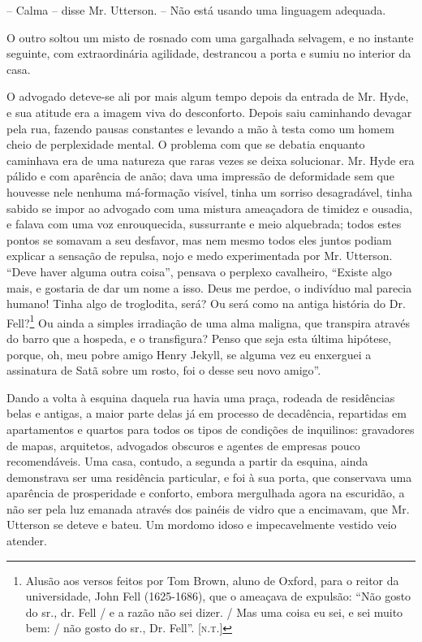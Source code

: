 -- Calma -- disse Mr. Utterson. -- Não está usando uma linguagem
adequada.

O outro soltou um misto de rosnado com uma gargalhada selvagem, e no
instante seguinte, com extraordinária agilidade, destrancou a porta e
sumiu no interior da casa.

O advogado deteve-se ali por mais algum tempo depois da entrada de Mr.
Hyde, e sua atitude era a imagem viva do desconforto.  Depois saiu
caminhando devagar pela rua, fazendo pausas constantes e levando a mão à
testa como um homem cheio de perplexidade mental.  O problema com que
se debatia enquanto caminhava era de uma natureza que raras vezes se
deixa solucionar.  Mr. Hyde era pálido e com aparência de anão; dava
uma impressão de deformidade sem que houvesse nele nenhuma má-formação
visível, tinha um sorriso desagradável, tinha sabido se impor ao
advogado com uma mistura ameaçadora de timidez e ousadia, e falava com
uma voz enrouquecida, sussurrante e meio alquebrada; todos estes pontos
se somavam a seu desfavor, mas nem mesmo todos eles juntos podiam
explicar a sensação de repulsa, nojo e medo experimentada por Mr.
Utterson.  “Deve haver alguma outra coisa”, pensava o perplexo
cavalheiro, “Existe algo mais, e gostaria de dar um nome a isso.  Deus
me perdoe, o indivíduo mal parecia humano!  Tinha algo de troglodita,
será?  Ou será como na antiga história do Dr. Fell?\footnote{
Alusão aos versos feitos por Tom Brown, aluno de Oxford, para o reitor
da universidade, John Fell (1625-1686), que o ameaçava de expulsão:
“Não gosto do sr., dr. Fell / e a razão não sei dizer. / Mas uma coisa
eu sei, e sei muito bem: / não gosto do sr., Dr. Fell”. [\textsc{n.t.}]} 
Ou ainda a simples irradiação de uma alma maligna, que transpira
através do barro que a hospeda, e o transfigura?  Penso que seja esta
última hipótese, porque, oh, meu pobre amigo Henry Jekyll, se alguma
vez eu enxerguei a assinatura de Satã sobre um rosto, foi o desse seu
novo amigo”.

Dando a volta à esquina daquela rua havia uma praça, rodeada de
residências belas e antigas, a maior parte delas já em processo de
decadência, repartidas em apartamentos e quartos para todos os tipos de
condições de inquilinos: gravadores de mapas, arquitetos, advogados
obscuros e agentes de empresas pouco recomendáveis.  Uma casa, contudo,
a segunda a partir da esquina, ainda demonstrava ser uma residência
particular, e foi à sua porta, que conservava uma aparência de
prosperidade e conforto, embora mergulhada agora na escuridão, a não
ser pela luz emanada através dos painéis de vidro que a encimavam, que
Mr. Utterson se deteve e bateu.  Um mordomo idoso e impecavelmente
vestido veio atender.

